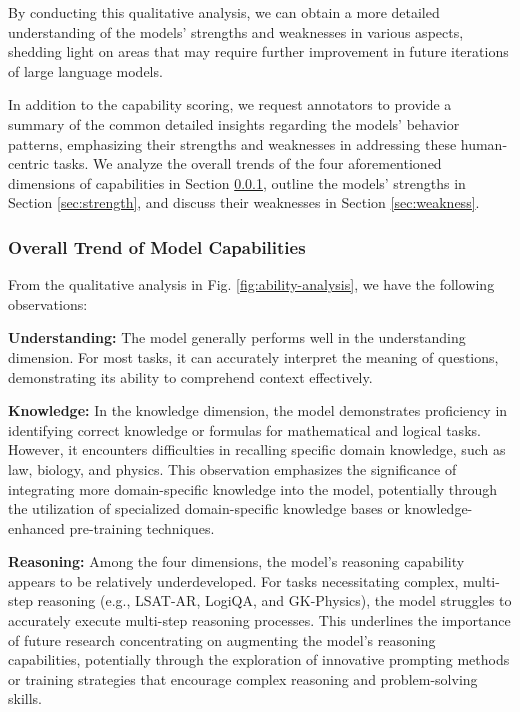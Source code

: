 By conducting this qualitative analysis, we can obtain a more detailed understanding of the models' strengths and weaknesses in various aspects, shedding light on areas that may require further improvement in future iterations of large language models.

In addition to the capability scoring, we request annotators to provide a summary of the common detailed insights regarding the models' behavior patterns, emphasizing their strengths and weaknesses in addressing these human-centric tasks. We analyze the overall trends of the four aforementioned dimensions of capabilities in Section \ref{sec:model-ability-trend}, outline the models' strengths in Section \ref{sec:strength}, and discuss their weaknesses in Section \ref{sec:weakness}.

\subsubsection{Overall Trend of Model Capabilities}
\label{sec:model-ability-trend}
From the qualitative analysis in Fig. \ref{fig:ability-analysis}, we have the following observations:

\textbf{Understanding:} The model generally performs well in the understanding dimension. For most tasks, it can accurately interpret the meaning of questions, demonstrating its ability to comprehend context effectively. 

\textbf{Knowledge:} In the knowledge dimension, the model demonstrates proficiency in identifying correct knowledge or formulas for mathematical and logical tasks. However, it encounters difficulties in recalling specific domain knowledge, such as law, biology, and physics. This observation emphasizes the significance of integrating more domain-specific knowledge into the model, potentially through the utilization of specialized domain-specific knowledge bases or knowledge-enhanced pre-training techniques.

\textbf{Reasoning:} Among the four dimensions, the model's reasoning capability appears to be relatively underdeveloped. For tasks necessitating complex, multi-step reasoning (e.g., LSAT-AR, LogiQA, and GK-Physics), the model struggles to accurately execute multi-step reasoning processes. This underlines the importance of future research concentrating on augmenting the model's reasoning capabilities, potentially through the exploration of innovative prompting methods or training strategies that encourage complex reasoning and problem-solving skills.

